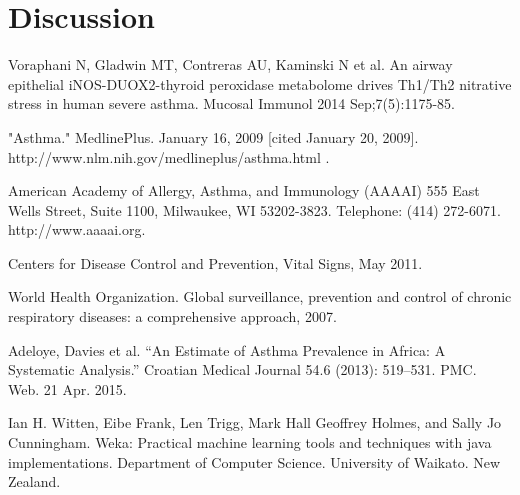 \documentclass[conference,a4paper]{IEEEtran}
\begin{document}
\section{Discussion}



\begin{thebibliography}{1}
	
	 Voraphani N, Gladwin MT, Contreras AU, Kaminski N et al. An airway epithelial iNOS-DUOX2-thyroid peroxidase metabolome drives Th1/Th2 nitrative stress in human severe asthma. Mucosal Immunol 2014 Sep;7(5):1175-85.
	
	 "Asthma." MedlinePlus. January 16, 2009 [cited January 20, 2009]. http://www.nlm.nih.gov/medlineplus/asthma.html .
	
	 American Academy of Allergy, Asthma, and Immunology (AAAAI) 555 East Wells Street, Suite 1100, Milwaukee, WI 53202-3823. Telephone: (414) 272-6071. http://www.aaaai.org.
	
	 Centers for Disease Control and Prevention, Vital Signs, May 2011.
	
	 World Health Organization. Global surveillance, prevention and control of chronic respiratory diseases: a comprehensive approach, 2007.
	
	 Adeloye, Davies et al. “An Estimate of Asthma Prevalence in Africa: A Systematic Analysis.” Croatian Medical Journal 54.6 (2013): 519–531. PMC. Web. 21 Apr. 2015.
	
	 Ian H. Witten, Eibe Frank, Len Trigg, Mark Hall Geoffrey Holmes, and Sally Jo Cunningham. Weka: Practical machine learning tools and techniques with java implementations. Department of Computer Science. University of Waikato. New Zealand.
	
	
\end{thebibliography}
\end{document}
